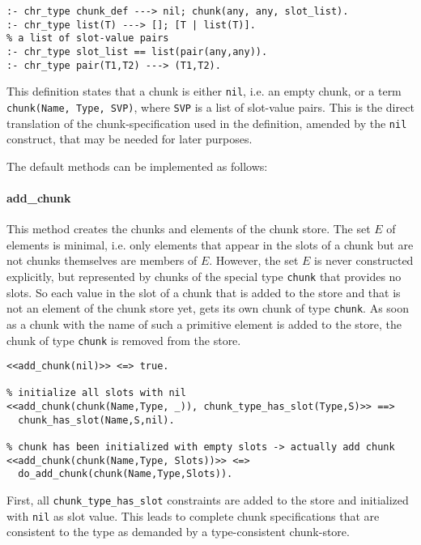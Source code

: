 \begin{lstlisting}
:- chr_type chunk_def ---> nil; chunk(any, any, slot_list).
:- chr_type list(T) ---> []; [T | list(T)].
% a list of slot-value pairs
:- chr_type slot_list == list(pair(any,any)).
:- chr_type pair(T1,T2) ---> (T1,T2).
\end{lstlisting}

This definition states that a chunk is either \verb|nil|, i.e. an empty chunk, or a term \verb|chunk(Name, Type, SVP)|, where \verb|SVP| is a list of slot-value pairs. This is the direct translation of the chunk-specification used in the definition, amended by the \verb|nil| construct, that may be needed for later purposes.

The default methods can be implemented as follows:

\paragraph{add\_chunk}

This method creates the chunks and elements of the chunk store. The set $E$ of elements is minimal, i.e. only elements that appear in the slots of a chunk but are not chunks themselves are members of $E$. However, the set $E$ is never constructed explicitly, but represented by chunks of the special type \verb|chunk| that provides no slots. So each value in the slot of a chunk that is added to the store and that is not an element of the chunk store yet, gets its own chunk of type \verb|chunk|. As soon as a chunk with the name of such a primitive element is added to the store, the chunk of type \verb|chunk| is removed from the store.

\begin{lstlisting}[caption={Rules for \texttt{add\_chunk}}, label=lst:add_chunk_rules]
% empty chunk will not be added
<<add_chunk(nil)>> <=> true.
  
% initialize all slots with nil
<<add_chunk(chunk(Name,Type, _)), chunk_type_has_slot(Type,S)>> ==> 
  chunk_has_slot(Name,S,nil).

% chunk has been initialized with empty slots -> actually add chunk
<<add_chunk(chunk(Name,Type, Slots))>> <=>
  do_add_chunk(chunk(Name,Type,Slots)).
\end{lstlisting}

First, all \verb|chunk_type_has_slot| constraints are added to the store and initialized with \verb|nil| as slot value. This leads to complete chunk specifications that are consistent to the type as demanded by a type-consistent chunk-store.


